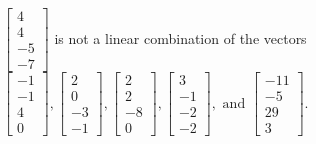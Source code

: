 \begin{exercise}
\begin{exerciseStatement}
  \end{exerciseStatement}
  \begin{exerciseAnswer}
   \(\left[\begin{array}{c}
4 \\
4 \\
-5 \\
-7
\end{array}\right]\) 
  	 is not  
	a linear combination of the vectors \(\left[\begin{array}{c}
-1 \\
-1 \\
4 \\
0
\end{array}\right] , \left[\begin{array}{c}
2 \\
0 \\
-3 \\
-1
\end{array}\right] , \left[\begin{array}{c}
2 \\
2 \\
-8 \\
0
\end{array}\right] , \left[\begin{array}{c}
3 \\
-1 \\
-2 \\
-2
\end{array}\right] , \text{ and } \left[\begin{array}{c}
-11 \\
-5 \\
29 \\
3
\end{array}\right]\).

	
  


  \end{exerciseAnswer}
\end{exercise}